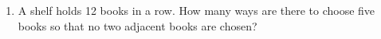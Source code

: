 \documentclass[12pt]{article}
\begin{document}
\begin{enumerate}
%
%
%
%
%
%
%
%
%
%
%
\iffalse
\item A shelf holds 12 books in a row.  How many ways are there to
choose five books so that no two adjacent books are chosen?


\end{enumerate}
\end{document}
